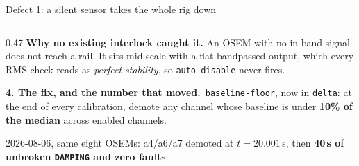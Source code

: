 \documentclass[aspectratio=169]{beamer}
\newcommand{\thefixn}{\textbf{4. The fix, and the number that moved.}}
\begin{document}
\begin{frame}{Defect 1: a silent sensor takes the whole rig down}
\begin{columns}[T]
\begin{column}{0.47\textwidth}
      \vspace{1.5mm}
      \textbf{Why no existing interlock caught it.} An OSEM with no in-band
      signal does not reach a rail. It sits mid-scale with a flat bandpassed
      output, which every RMS check reads as \emph{perfect stability}, so
      \texttt{auto-disable} never fires.

      \vspace{1.5mm}
      \thefixn\ \texttt{baseline-floor}, now in \texttt{delta}: at the end of
      every calibration, demote any channel whose baseline is under \textbf{10\%
      of the median} across enabled channels.

      \vspace{1mm}
      2026-08-06, same eight OSEMs: a4/a6/a7 demoted at $t = 20.001$\,s, then
      \textbf{40\,s of unbroken \texttt{DAMPING} and zero faults}.
    \end{column}
  \end{columns}
\end{frame}
\end{document}
